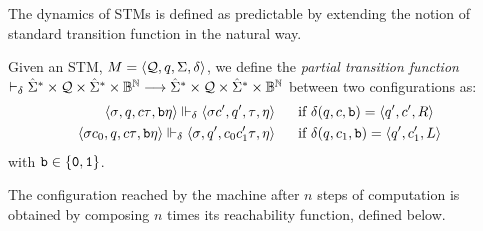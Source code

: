 The dynamics of STMs is defined
as predictable by extending the notion of standard
transition function in the natural way.


\begin{defn}\label{df:STMTransition}
Given an STM, $M=\langle
\textcolor{black}{\mathcal{Q}}, \textcolor{black}{q}, \textcolor{black}{\Sigma}, \textcolor{black}{\delta}\rangle$,
we define the \emph{partial transition function}
$\vdash_{\delta} \hat{\Sigma}^* \times
\mathcal{Q} \times \hat{\Sigma}^* \times
\mathbb{B}^{\mathbb{N}} \longrightarrow
\hat{\Sigma}^* \times
\mathcal{Q} \times \hat{\Sigma}^*
\times \mathbb{B}^{\mathbb{N}}$
between two configurations as:
%
\begin{align*}
\langle \m{\sigma}, \m{q}, \m{c\tau}, \m{\bool\eta}\rangle
%
\stmtrans_{\delta}
%
\langle \m{\sigma c'}, \m{q'}, \m{\tau}, \m{\eta}\rangle
%
\ \ \ \ \ &\text{if} \ \m{\delta}(\m{q},\m{c},\m{\bool}) =
\langle \m{q'}, \m{c'}, \m{R}\rangle \\
%
%
%
\langle \m{\sigma c_0},
\m{q}, \m{c\tau},
\m{\bool\eta \rangle}
\stmtrans_{\delta}
\langle \m{\sigma},
\m{q'}, \m{c_0c_1'\tau},
\m{\eta}\rangle
%
\ \ \ \ \ &\text{if} \ \m{\delta}(\m{q}, \m{c_1},
\m{\bool}) = \langle
\m{q'}, \m{c_1'}, \m{L}\rangle
%
%
%
%
%
\end{align*}
\noindent
with $\mathtt{b} \in \{\mathtt{0}, \mathtt{1}\}$.
%
\end{defn}
%
%
%
\noindent
The configuration reached by the machine
after $n$ steps of computation is obtained
by composing $n$ times
its reachability function, defined below.



